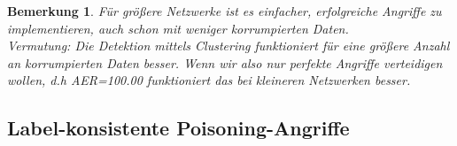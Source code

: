 \documentclass[11pt,a4paper]{article}
\newtheorem{remark}[theorem]{Bemerkung}
\numberwithin{equation}{section}
\begin{document}
	\begin{remark}
		Für größere Netzwerke ist es einfacher, erfolgreiche Angriffe zu implementieren, auch schon mit weniger korrumpierten Daten.\\
		Vermutung: Die Detektion mittels Clustering funktioniert für eine größere Anzahl an korrumpierten Daten besser. Wenn wir also nur perfekte Angriffe verteidigen wollen, d.h AER=100.00 funktioniert das bei kleineren Netzwerken besser.
	\end{remark}
	\subsection{Label-konsistente Poisoning-Angriffe}

\end{document}
